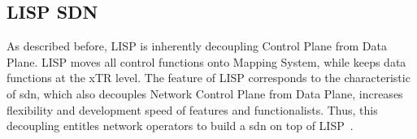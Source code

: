 \subsection{LISP SDN}
\label{subsubsec:sdn}
As described before, LISP is inherently decoupling Control Plane from Data Plane. LISP moves all control functions onto Mapping System, while keeps data functions at the xTR level.%
The feature of LISP corresponds to the characteristic of \acrfull{sdn}, which also decouples Network Control Plane from Data Plane, increases flexibility and development speed of features and functionalists. Thus, this decoupling entitles network operators to build a \acrfull{sdn} on top of LISP~\cite{rodriguez2014software}.

